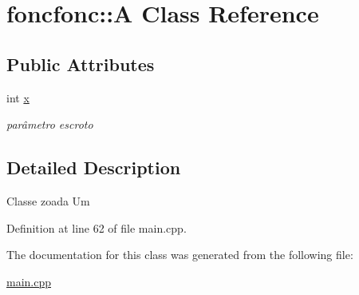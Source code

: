 \hypertarget{classfoncfonc_1_1A}{\section{foncfonc\-:\-:A Class Reference}
\label{classfoncfonc_1_1A}
}
\subsection*{Public Attributes}
\begin{DoxyCompactItemize}
\item 
\hypertarget{classfoncfonc_1_1A_a54959ea2ab58000251776e0d819878f2}{int \hyperlink{classfoncfonc_1_1A_a54959ea2ab58000251776e0d819878f2}{x}}\label{classfoncfonc_1_1A_a54959ea2ab58000251776e0d819878f2}

\begin{DoxyCompactList}\small\item\em parâmetro escroto \end{DoxyCompactList}\end{DoxyCompactItemize}


\subsection{Detailed Description}
Classe zoada Um 

Definition at line 62 of file main.\-cpp.



The documentation for this class was generated from the following file\-:\begin{DoxyCompactItemize}
\item 
\hyperlink{main_8cpp}{main.\-cpp}\end{DoxyCompactItemize}
